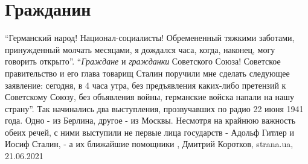  
 
 
 
 
\chapter{Гражданин}
\label{sec:slova.grazhdanin}

\enquote{Германский народ! Национал-социалисты! Обремененный тяжкими заботами,
принужденный молчать месяцами, я дождался часа, когда, наконец, могу говорить
открыто}.  \enquote{\emph{Граждане} и \emph{гражданки} Советского Союза!
Советское правительство и его глава товарищ Сталин поручили мне сделать
следующее заявление: сегодня, в 4 часа утра, без предъявления каких-либо
претензий к Советскому Союзу, без объявления войны, германские войска напали на
нашу страну}. Так начинались два выступления, прозвучавших по радио 22 июня
1941 года. Одно - из Берлина, другое - из Москвы. Несмотря на крайнюю важность
обеих речей, с ними выступили не первые лица государств - Адольф Гитлер и Иосиф
Сталин, - а их ближайшие помощники
, Дмитрий Коротков, strana.ua, 21.06.2021

